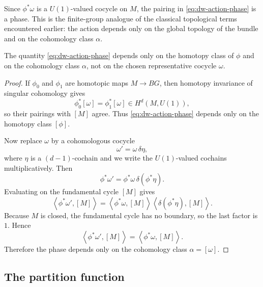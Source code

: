 \noindent Since $\phi^*\omega$ is a $U(1)$-valued cocycle on $M$, the pairing in \eqref{eq:dw-action-phase} is a phase. This is the finite-group analogue of the classical topological terms encountered earlier: the action depends only on the global topology of the bundle and on the cohomology class $\alpha$.

\begin{proposition}\label{prop:dw-welldefined}
The quantity \eqref{eq:dw-action-phase} depends only on the homotopy class of $\phi$ and on the cohomology class $\alpha$, not on the chosen representative cocycle $\omega$.
\end{proposition}

\begin{proof}
If $\phi_0$ and $\phi_1$ are homotopic maps $M\to BG$, then homotopy invariance of singular cohomology gives
\begin{equation*}
\phi_0^*[\omega]=\phi_1^*[\omega]\in H^d(M,U(1)),
\end{equation*}
so their pairings with $[M]$ agree. Thus \eqref{eq:dw-action-phase} depends only on the homotopy class $[\phi]$.

\medskip

\noindent Now replace $\omega$ by a cohomologous cocycle
\begin{equation*}
\omega'=\omega\,\delta \eta,
\end{equation*}
where $\eta$ is a $(d-1)$-cochain and we write the $U(1)$-valued cochains multiplicatively. Then
\begin{equation*}
\phi^*\omega'=\phi^*\omega\,\delta(\phi^*\eta).
\end{equation*}
Evaluating on the fundamental cycle $[M]$ gives
\begin{equation*}
\left\langle \phi^*\omega',[M]\right\rangle
=
\left\langle \phi^*\omega,[M]\right\rangle
\left\langle \delta(\phi^*\eta),[M]\right\rangle.
\end{equation*}
Because $M$ is closed, the fundamental cycle has no boundary, so the last factor is $1$. Hence
\begin{equation*}
\left\langle \phi^*\omega',[M]\right\rangle
=
\left\langle \phi^*\omega,[M]\right\rangle.
\end{equation*}
Therefore the phase depends only on the cohomology class $\alpha=[\omega]$.
\end{proof}

\subsection{The partition function}

